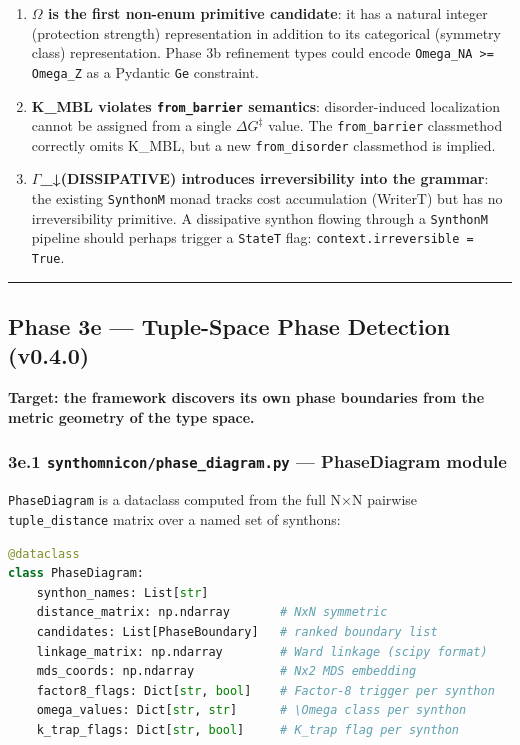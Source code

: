 \documentclass[12pt,a4paper]{article}
\begin{document}
\begin{enumerate}
    \item \textbf{$\Omega$ is the first non-enum primitive candidate}: it has a natural integer (protection strength) representation in addition to its categorical (symmetry class) representation. Phase 3b refinement types could encode \texttt{Omega\_NA \textgreater{}= Omega\_Z} as a Pydantic \texttt{Ge} constraint.
    \item \textbf{K\_MBL violates \texttt{from\_barrier} semantics}: disorder-induced localization cannot be assigned from a single $\Delta G^{\ddagger}$ value. The \texttt{from\_barrier} classmethod correctly omits K\_MBL, but a new \texttt{from\_disorder} classmethod is implied.
    \item \textbf{$\Gamma$\_↓(DISSIPATIVE) introduces irreversibility into the grammar}: the existing \texttt{SynthonM} monad tracks cost accumulation (WriterT) but has no irreversibility primitive. A dissipative synthon flowing through a \texttt{SynthonM} pipeline should perhaps trigger a \texttt{StateT} flag: \texttt{context.irreversible = True}.
\end{enumerate}

\begin{center}
\rule{0.5\textwidth}{0.4pt}
\end{center}

\subsection{Phase 3e --- Tuple-Space Phase Detection (v0.4.0)}

\textbf{Target: the framework discovers its own phase boundaries from the metric geometry of the type space.}

\subsubsection{3e.1 \texttt{synthomnicon/phase\_diagram.py} --- PhaseDiagram module}

\texttt{PhaseDiagram} is a dataclass computed from the full N$\times$N pairwise \texttt{tuple\_distance} matrix over a named set of synthons:

\begin{lstlisting}[language=Python]
@dataclass
class PhaseDiagram:
    synthon_names: List[str]
    distance_matrix: np.ndarray       # NxN symmetric
    candidates: List[PhaseBoundary]   # ranked boundary list
    linkage_matrix: np.ndarray        # Ward linkage (scipy format)
    mds_coords: np.ndarray            # Nx2 MDS embedding
    factor8_flags: Dict[str, bool]    # Factor-8 trigger per synthon
    omega_values: Dict[str, str]      # \Omega class per synthon
    k_trap_flags: Dict[str, bool]     # K_trap flag per synthon
\end{lstlisting}
\end{document}

